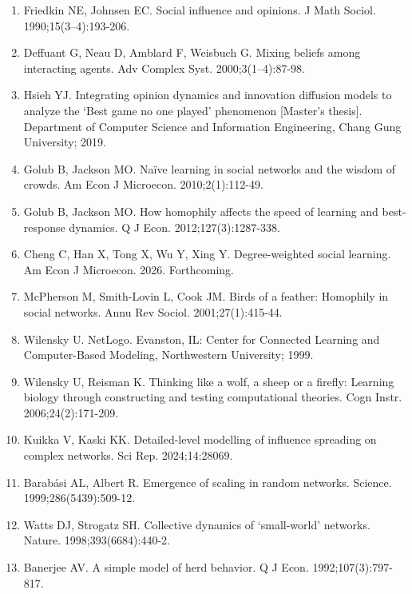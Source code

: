 \documentclass[10pt,letterpaper]{article}
\begin{document}
\begin{enumerate}
\item Friedkin NE, Johnsen EC.
Social influence and opinions.
J Math Sociol. 1990;15(3--4):193-206.

\item Deffuant G, Neau D, Amblard F, Weisbuch G.
Mixing beliefs among interacting agents.
Adv Complex Syst. 2000;3(1--4):87-98.

\item Hsieh YJ.
Integrating opinion dynamics and innovation diffusion models to
  analyze the `{B}est game no one played' phenomenon [Master's thesis].
Department of Computer Science and Information Engineering, Chang
  Gung University; 2019.

\item Golub B, Jackson MO.
Na\"{i}ve learning in social networks and the wisdom of crowds.
Am Econ J Microecon. 2010;2(1):112-49.

\item Golub B, Jackson MO.
How homophily affects the speed of learning and best-response
  dynamics.
Q J Econ. 2012;127(3):1287-338.

\item Cheng C, Han X, Tong X, Wu Y, Xing Y.
Degree-weighted social learning.
Am Econ J Microecon. 2026.
Forthcoming.

\item McPherson M, Smith-Lovin L, Cook JM.
Birds of a feather: Homophily in social networks.
Annu Rev Sociol. 2001;27(1):415-44.

\item Wilensky U.
{NetLogo}.
Evanston, IL: Center for Connected Learning and Computer-Based
  Modeling, Northwestern University; 1999.

\item Wilensky U, Reisman K.
Thinking like a wolf, a sheep or a firefly: Learning biology through
  constructing and testing computational theories.
Cogn Instr. 2006;24(2):171-209.

\item Kuikka V, Kaski KK.
Detailed-level modelling of influence spreading on complex networks.
Sci Rep. 2024;14:28069.

\item Barab{\'a}si AL, Albert R.
Emergence of scaling in random networks.
Science. 1999;286(5439):509-12.

\item Watts DJ, Strogatz SH.
Collective dynamics of `small-world' networks.
Nature. 1998;393(6684):440-2.

\item Banerjee AV.
A simple model of herd behavior.
Q J Econ. 1992;107(3):797-817.


\end{enumerate}
\end{document}

